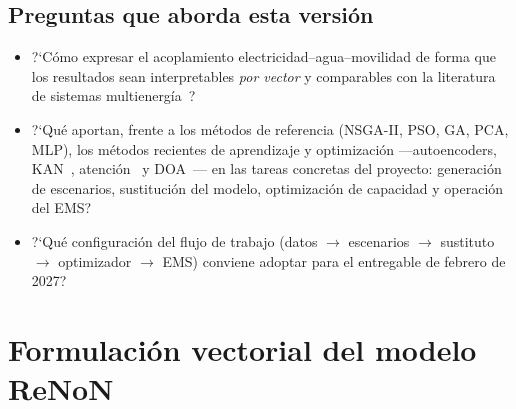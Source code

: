 \documentclass[11pt,a4paper]{article}
\begin{document}
\subsection{Preguntas que aborda esta versi\'on}
\begin{itemize}[leftmargin=1.4em]
  \item ?`C\'omo expresar el acoplamiento electricidad--agua--movilidad de forma que los
  resultados sean interpretables \emph{por vector} y comparables con la literatura de
  sistemas multienerg\'ia~\cite{mancarella2014,chicco2009}?
  \item ?`Qu\'e aportan, frente a los m\'etodos de referencia (NSGA-II, PSO, GA, PCA,
  MLP), los m\'etodos recientes de aprendizaje y optimizaci\'on ---autoencoders,
  KAN~\cite{liu2024kan}, atenci\'on~\cite{vaswani2017} y DOA~\cite{lang2025}--- en las
  tareas concretas del proyecto: generaci\'on de escenarios, sustituci\'on del modelo,
  optimizaci\'on de capacidad y operaci\'on del EMS?
  \item ?`Qu\'e configuraci\'on del flujo de trabajo (datos $\to$ escenarios $\to$
  sustituto $\to$ optimizador $\to$ EMS) conviene adoptar para el entregable de
  febrero de 2027?
\end{itemize}

\section{Formulaci\'on vectorial del modelo ReNoN}
\label{sec:modelo}
\end{document}
